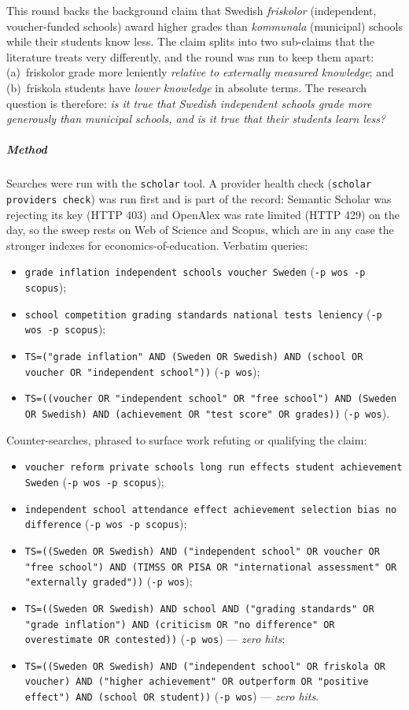 This round backs the background claim that Swedish \emph{friskolor}
(independent, voucher-funded schools) award higher grades than
\emph{kommunala} (municipal) schools while their students know less.
The claim splits into two sub-claims that the literature treats very
differently, and the round was run to keep them apart:
(a)~friskolor grade more leniently \emph{relative to externally measured
knowledge}; and (b)~friskola students have \emph{lower knowledge} in
absolute terms.
The research question is therefore: \emph{is it true that Swedish
independent schools grade more generously than municipal schools, and is
it true that their students learn less?}

\subparagraph{Method}
Searches were run with the \texttt{scholar} tool.  A provider health check
(\texttt{scholar providers check}) was run first and is part of the record:
Semantic Scholar was rejecting its key (HTTP 403) and OpenAlex was rate
limited (HTTP 429) on the day, so the sweep rests on Web of Science and
Scopus, which are in any case the stronger indexes for
economics-of-education.  Verbatim queries:
\begin{itemize}
  \item \texttt{grade inflation independent schools voucher Sweden}
    (\texttt{-p wos -p scopus});
  \item \texttt{school competition grading standards national tests
    leniency} (\texttt{-p wos -p scopus});
  \item \texttt{TS=("grade inflation" AND (Sweden OR Swedish) AND (school
    OR voucher OR "independent school"))} (\texttt{-p wos});
  \item \texttt{TS=((voucher OR "independent school" OR "free school") AND
    (Sweden OR Swedish) AND (achievement OR "test score" OR grades))}
    (\texttt{-p wos}).
\end{itemize}
Counter-searches, phrased to surface work refuting or qualifying the
claim:
\begin{itemize}
  \item \texttt{voucher reform private schools long run effects student
    achievement Sweden} (\texttt{-p wos -p scopus});
  \item \texttt{independent school attendance effect achievement selection
    bias no difference} (\texttt{-p wos -p scopus});
  \item \texttt{TS=((Sweden OR Swedish) AND ("independent school" OR
    voucher OR "free school") AND (TIMSS OR PISA OR "international
    assessment" OR "externally graded"))} (\texttt{-p wos});
  \item \texttt{TS=((Sweden OR Swedish) AND school AND ("grading
    standards" OR "grade inflation") AND (criticism OR "no difference" OR
    overestimate OR contested))} (\texttt{-p wos}) --- \emph{zero hits};
  \item \texttt{TS=((Sweden OR Swedish) AND ("independent school" OR
    friskola OR voucher) AND ("higher achievement" OR outperform OR
    "positive effect") AND (school OR student))} (\texttt{-p wos}) ---
    \emph{zero hits}.
\end{itemize}

